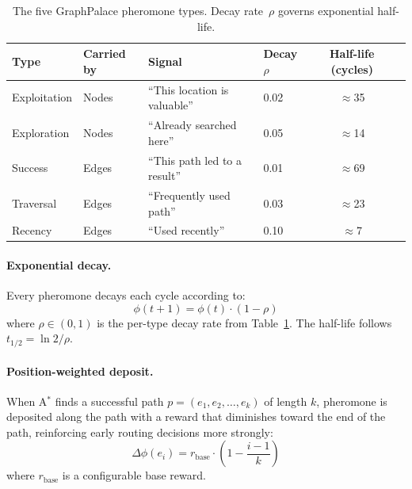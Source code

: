 \documentclass[11pt,a4paper]{article}
\begin{document}
\begin{table}[ht]
\centering
\caption{The five GraphPalace pheromone types.  Decay rate~$\rho$ governs
exponential half-life.}
\label{tab:pheromones}
\setlength{\tabcolsep}{6pt}
\begin{tabular}{llllcc}
\toprule
\textbf{Type} & \textbf{Carried by} & \textbf{Signal} & \textbf{Decay $\rho$} & \textbf{Half-life (cycles)} \\
\midrule
Exploitation & Nodes & ``This location is valuable'' & 0.02 & $\approx$35 \\
Exploration  & Nodes & ``Already searched here''     & 0.05 & $\approx$14 \\
Success      & Edges & ``This path led to a result'' & 0.01 & $\approx$69 \\
Traversal    & Edges & ``Frequently used path''      & 0.03 & $\approx$23 \\
Recency      & Edges & ``Used recently''             & 0.10 & $\approx$7  \\
\bottomrule
\end{tabular}
\end{table}

\paragraph{Exponential decay.}
Every pheromone decays each cycle according to:
\begin{equation}
\phi(t+1) = \phi(t) \cdot (1 - \rho)
\label{eq:decay}
\end{equation}
where $\rho \in (0,1)$ is the per-type decay rate from Table~\ref{tab:pheromones}.
The half-life follows $t_{1/2} = \ln 2 / \rho$.

\paragraph{Position-weighted deposit.}
When A$^*$ finds a successful path $p = (e_1, e_2, \ldots, e_k)$ of length $k$,
pheromone is deposited along the path with a reward that diminishes toward the
end of the path, reinforcing early routing decisions more strongly:
\begin{equation}
\Delta\phi(e_i) = r_{\text{base}} \cdot \left(1 - \frac{i-1}{k}\right)
\label{eq:deposit}
\end{equation}
where $r_{\text{base}}$ is a configurable base reward.
\end{document}
